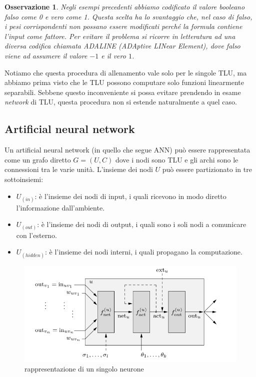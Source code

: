\documentclass[10pt,a4paper]{article}
\newtheorem{remark}{Osservazione}
\begin{document}
\begin{remark}
Negli esempi precedenti abbiamo codificato il valore booleano \emph{falso} come 0 e \emph{vero} come 1. Questa scelta ha lo svantaggio che, nel caso di \emph{falso}, i pesi corrispondenti non possano essere modificati perché la formula contiene l'input come fattore. Per evitare il problema si ricorre in letteratura ad una diversa codifica chiamata \emph{ADALINE} (ADAptive LINear Element), dove \emph{falso} viene ad assumere il valore $-1$ e il \emph{vero} $1$.
\end{remark}

Notiamo che questa procedura di allenamento vale solo per le singole TLU, ma abbiamo prima visto che le TLU possono computare solo funzioni linearmente separabili. Sebbene questo inconveniente si possa evitare prendendo in esame \emph{network} di TLU, questa procedura non si estende naturalmente a quel caso.

\subsection{Artificial neural network}

Un artificial neural network (in quello che segue ANN) può essere rappresentata come un grafo diretto $G = (U,C)$ dove i nodi sono TLU e gli archi sono le connessioni tra le varie unità. L'insieme dei nodi $U$ può essere partizionato in tre sottoinsiemi:

\begin{itemize}
\item{$U_{(in)}$: è l'insieme dei nodi di input, i quali ricevono in modo diretto l'informazione dall'ambiente.}
\item{$U_{(out)}$: è l'insieme dei nodi di output, i quali sono i soli nodi a comunicare con l'esterno.}
\item{$U_{(hidden)}$: è l'insieme dei nodi interni, i quali propagano la computazione.}
\end{itemize}

\begin{figure}
\centering
\includegraphics[scale=0.4]{img/ANN.png}
\caption{rappresentazione di un singolo neurone}
\label{fig:7}
\end{figure}
\end{document}
